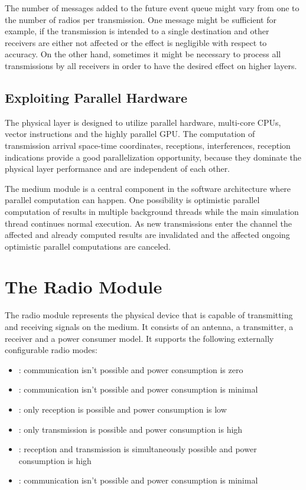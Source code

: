 The number of messages added to the future event queue might vary from one to
the number of radios per transmission. One message might be sufficient for example,
if the transmission is intended to a single destination and other receivers are
either not affected or the effect is negligible with respect to accuracy. On the
other hand, sometimes it might be necessary to process all transmissions by all
receivers in order to have the desired effect on higher layers.

\subsection{Exploiting Parallel Hardware}

The physical layer is designed to utilize parallel hardware, multi-core CPUs,
vector instructions and the highly parallel GPU. The computation of transmission
arrival space-time coordinates, receptions, interferences, reception indications
provide a good parallelization opportunity, because they dominate the physical
layer performance and are independent of each other. 

The medium module is a central component in the software architecture where
parallel computation can happen. One possibility is optimistic parallel
computation of results in multiple background threads while the main simulation
thread continues normal execution. As new transmissions enter the channel the
affected and already computed results are invalidated and the affected ongoing
optimistic parallel computations are canceled.

\section{The Radio Module}

The radio module represents the physical device that is capable of transmitting
and receiving signals on the medium. It consists of an antenna, a transmitter, a
receiver and a power consumer model. It supports the following externally
configurable radio modes: 

\begin{itemize}
  \item {}: communication isn't possible and power consumption is zero
  \item {}: communication isn't possible and power consumption is minimal
  \item {}: only reception is possible and power consumption is low
  \item {}: only transmission is possible and power consumption
is high
  \item {}: reception and transmission is simultaneously possible
and power consumption is high
  \item {}: communication isn't possible and power consumption is
minimal
\end{itemize}

